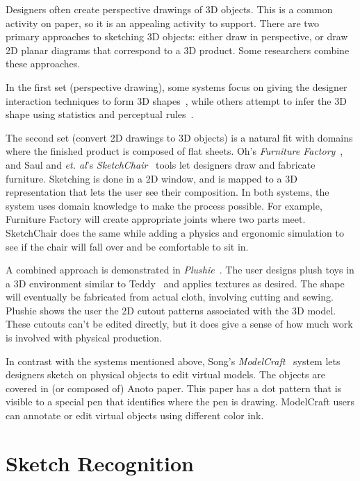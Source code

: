 

Designers often create perspective drawings of 3D objects. This is a
common activity on paper, so it is an appealing activity to
support. There are two primary approaches to sketching 3D objects:
either draw in perspective, or draw 2D planar diagrams that correspond
to a 3D product. Some researchers combine these approaches.

In the first set (perspective drawing), some systems focus on giving
the designer interaction techniques to form 3D
shapes~\cite{kara-3d-styling,bloomenthal-sketch-n-make}, while others
attempt to infer the 3D shape using statistics and perceptual
rules~\cite{lipson-correlation}. 

The second set (convert 2D drawings to 3D objects) is a natural fit
with domains where the finished product is composed of flat
sheets. Oh's \textit{Furniture Factory}~\cite{oh-fab}, and Saul and
\textit{et. al}'s \textit{SketchChair}~\cite{saul-sketch-chair} tools
let designers draw and fabricate furniture. Sketching is done in a 2D
window, and is mapped to a 3D representation that lets the user see
their composition. In both systems, the system uses domain knowledge
to make the process possible. For example, Furniture Factory will
create appropriate joints where two parts meet. SketchChair does the
same while adding a physics and ergonomic simulation to see if the
chair will fall over and be comfortable to sit in.

A combined approach is demonstrated in
\textit{Plushie}~\cite{mori-plushie}. The user designs plush toys in a
3D environment similar to Teddy~\cite{igarashi-teddy} and applies
textures as desired. The shape will eventually be fabricated from
actual cloth, involving cutting and sewing. Plushie shows the user the
2D cutout patterns associated with the 3D model. These cutouts can't
be edited directly, but it does give a sense of how much work is
involved with physical production.

In contrast with the systems mentioned above, Song's
\textit{ModelCraft}~\cite{song-modelcraft} system lets designers
sketch on physical objects to edit virtual models. The objects are
covered in (or composed of) Anoto paper. This paper has a dot pattern
that is visible to a special pen that identifies where the pen is
drawing. ModelCraft users can annotate or edit virtual objects using
different color ink. 

\section{Sketch Recognition}

